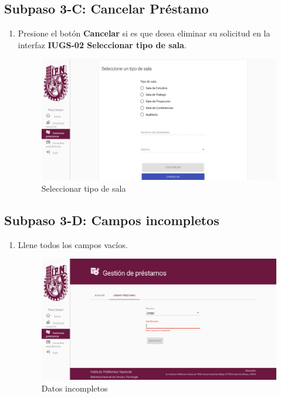 \subsection{Subpaso 3-C: Cancelar Préstamo}
\begin{enumerate}
	\item Presione el botón \textbf{Cancelar} si es que desea eliminar
  su solicitud en la interfaz  \textbf{IUGS-02 Seleccionar tipo de sala}.
    \begin{figure}[hbtp]
	\includegraphics[scale=0.3]{images/Interfaz/IUGS-02 Seleccionar tipo de sala.png}
	\caption{Seleccionar tipo de sala}
	\end{figure}
\end{enumerate}

\subsection{Subpaso 3-D: Campos incompletos}
\begin{enumerate}
	\item Llene todos los campos vacíos.
	  \begin{figure}[hbtp]
	\includegraphics[scale=0.3]{images/Interfaz/MAT-18 Datos incompletos.png}
	\caption{Datos incompletos}
	\end{figure}
\end{enumerate}

